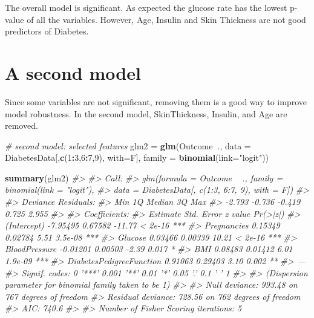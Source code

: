 \documentclass[]{book}
\newenvironment{Shaded}{\begin{snugshade}}{\end{snugshade}}
\newcommand{\CommentTok}[1]{\textcolor[rgb]{0.56,0.35,0.01}{\textit{#1}}}
\newcommand{\DataTypeTok}[1]{\textcolor[rgb]{0.13,0.29,0.53}{#1}}
\newcommand{\DecValTok}[1]{\textcolor[rgb]{0.00,0.00,0.81}{#1}}
\newcommand{\KeywordTok}[1]{\textcolor[rgb]{0.13,0.29,0.53}{\textbf{#1}}}
\newcommand{\NormalTok}[1]{#1}
\newcommand{\OperatorTok}[1]{\textcolor[rgb]{0.81,0.36,0.00}{\textbf{#1}}}
\newcommand{\StringTok}[1]{\textcolor[rgb]{0.31,0.60,0.02}{#1}}
\begin{document}
The overall model is significant. As expected the glucose rate has the lowest p-value of all the variables. However, Age, Insulin and Skin Thickness are not good predictors of Diabetes.

\hypertarget{a-second-model}{%
\section{A second model}\label{a-second-model}}

Since some variables are not significant, removing them is a good way to improve model robustness. In the second model, SkinThickness, Insulin, and Age are removed.

\begin{Shaded}
\begin{Highlighting}[]
\CommentTok{# second model: selected features}
\NormalTok{glm2 =}\StringTok{ }\KeywordTok{glm}\NormalTok{(Outcome}\OperatorTok{~}\NormalTok{., }
         \DataTypeTok{data =}\NormalTok{ DiabetesData[,}\KeywordTok{c}\NormalTok{(}\DecValTok{1}\OperatorTok{:}\DecValTok{3}\NormalTok{,}\DecValTok{6}\OperatorTok{:}\DecValTok{7}\NormalTok{,}\DecValTok{9}\NormalTok{), }\DataTypeTok{with=}\NormalTok{F], }
         \DataTypeTok{family =} \KeywordTok{binomial}\NormalTok{(}\DataTypeTok{link=}\StringTok{"logit"}\NormalTok{))}

\KeywordTok{summary}\NormalTok{(glm2)}
\CommentTok{#> }
\CommentTok{#> Call:}
\CommentTok{#> glm(formula = Outcome ~ ., family = binomial(link = "logit"), }
\CommentTok{#>     data = DiabetesData[, c(1:3, 6:7, 9), with = F])}
\CommentTok{#> }
\CommentTok{#> Deviance Residuals: }
\CommentTok{#>    Min      1Q  Median      3Q     Max  }
\CommentTok{#> -2.793  -0.736  -0.419   0.725   2.955  }
\CommentTok{#> }
\CommentTok{#> Coefficients:}
\CommentTok{#>                          Estimate Std. Error z value Pr(>|z|)    }
\CommentTok{#> (Intercept)              -7.95495    0.67582  -11.77  < 2e-16 ***}
\CommentTok{#> Pregnancies               0.15349    0.02784    5.51  3.5e-08 ***}
\CommentTok{#> Glucose                   0.03466    0.00339   10.21  < 2e-16 ***}
\CommentTok{#> BloodPressure            -0.01201    0.00503   -2.39    0.017 *  }
\CommentTok{#> BMI                       0.08483    0.01412    6.01  1.9e-09 ***}
\CommentTok{#> DiabetesPedigreeFunction  0.91063    0.29403    3.10    0.002 ** }
\CommentTok{#> ---}
\CommentTok{#> Signif. codes:  0 '***' 0.001 '**' 0.01 '*' 0.05 '.' 0.1 ' ' 1}
\CommentTok{#> }
\CommentTok{#> (Dispersion parameter for binomial family taken to be 1)}
\CommentTok{#> }
\CommentTok{#>     Null deviance: 993.48  on 767  degrees of freedom}
\CommentTok{#> Residual deviance: 728.56  on 762  degrees of freedom}
\CommentTok{#> AIC: 740.6}
\CommentTok{#> }
\CommentTok{#> Number of Fisher Scoring iterations: 5}
\end{Highlighting}
\end{Shaded}
\end{document}
